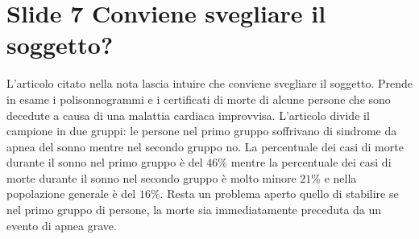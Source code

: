 \section{Slide 7 Conviene svegliare il soggetto?}
L'articolo citato nella nota lascia intuire che conviene svegliare il soggetto.
Prende in esame i polisonnogrammi e i certificati di morte di alcune persone che sono decedute a causa di una malattia cardiaca improvvisa. 
L'articolo divide il campione in due gruppi: le persone nel primo gruppo soffrivano di sindrome da apnea del sonno mentre nel secondo gruppo no.
La percentuale dei casi di morte durante il sonno nel primo gruppo \`e del $46\%$ mentre la percentuale dei casi di morte durante il sonno nel secondo gruppo \`e molto minore $21\%$ e nella popolazione generale \`e del $16\%$.
Resta un problema aperto quello di stabilire se nel primo gruppo di persone, la morte sia immediatamente preceduta da un evento di apnea grave.
